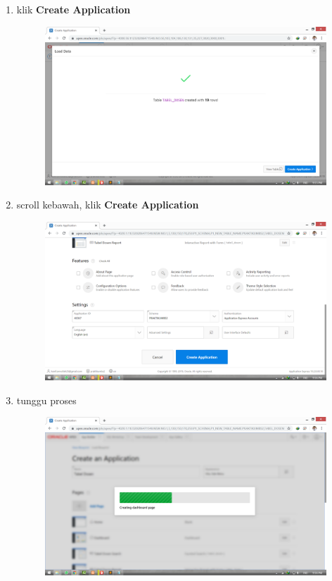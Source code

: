 \documentclass[11pt]{article}
\begin{document}
\begin{enumerate}
\item klik \textbf{Create Application}
	\begin{figure}[h]
        \centerline{\includegraphics[scale=0.1]{img/9.png}}
        \centering
        \caption{}
		\label{langkah15}
	\end{figure}

\newpage	
\item scroll kebawah, klik \textbf{Create Application}
	\begin{figure}[h]
        \centerline{\includegraphics[scale=0.1]{img/10.png}}
        \centering
        \caption{}
		\label{langkah16}
	\end{figure}
	
\item tunggu proses
	\begin{figure}[h]
        \centerline{\includegraphics[scale=0.1]{img/11.png}}
        \centering
        \caption{}
		\label{langkah17}
	\end{figure}
	

\end{enumerate}
\end{document}
